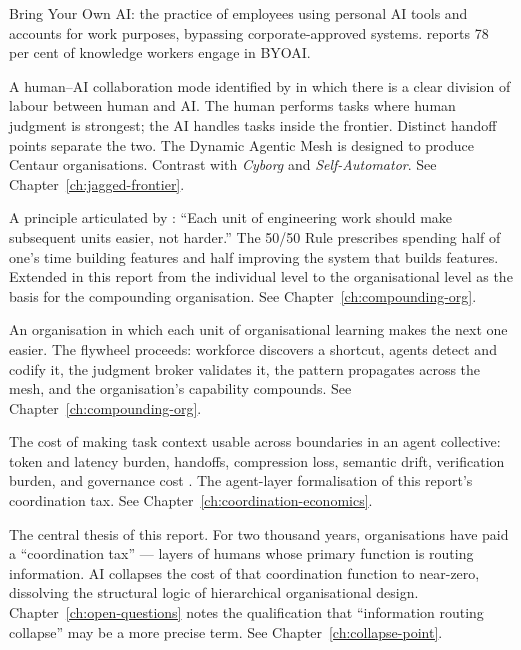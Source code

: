 \begin{description}[style=nextline, leftmargin=2em, font=\bfseries\color{navyblue}]
\item[BYOAI]
Bring Your Own AI: the practice of employees using personal AI tools and accounts for work purposes, bypassing corporate-approved systems. \textcite{MicrosoftWorkTrend2024} reports 78 per cent of knowledge workers engage in BYOAI.

\item[Centaur]
A human--AI collaboration mode identified by \textcite{Randazzo2024} in which there is a clear division of labour between human and AI. The human performs tasks where human judgment is strongest; the AI handles tasks inside the frontier. Distinct handoff points separate the two. The Dynamic Agentic Mesh is designed to produce Centaur organisations. Contrast with \emph{Cyborg} and \emph{Self-Automator}. See Chapter~\ref{ch:jagged-frontier}.

\item[Compound Engineering]
A principle articulated by \textcite{Klaassen2025}: ``Each unit of engineering work should make subsequent units easier, not harder.'' The 50/50 Rule prescribes spending half of one's time building features and half improving the system that builds features. Extended in this report from the individual level to the organisational level as the basis for the compounding organisation. See Chapter~\ref{ch:compounding-org}.

\item[Compounding Organisation]
An organisation in which each unit of organisational learning makes the next one easier. The flywheel proceeds: workforce discovers a shortcut, agents detect and codify it, the judgment broker validates it, the pattern propagates across the mesh, and the organisation's capability compounds. See Chapter~\ref{ch:compounding-org}.

\item[Contextual Transaction Cost (CTC)]
The cost of making task context usable across boundaries in an agent collective: token and latency burden, handoffs, compression loss, semantic drift, verification burden, and governance cost \parencite{Liu2026}. The agent-layer formalisation of this report's coordination tax. See Chapter~\ref{ch:coordination-economics}.

\item[Coordination Collapse]
The central thesis of this report. For two thousand years, organisations have paid a ``coordination tax'' --- layers of humans whose primary function is routing information. AI collapses the cost of that coordination function to near-zero, dissolving the structural logic of hierarchical organisational design. Chapter~\ref{ch:open-questions} notes the qualification that ``information routing collapse'' may be a more precise term. See Chapter~\ref{ch:collapse-point}.


\end{description}
